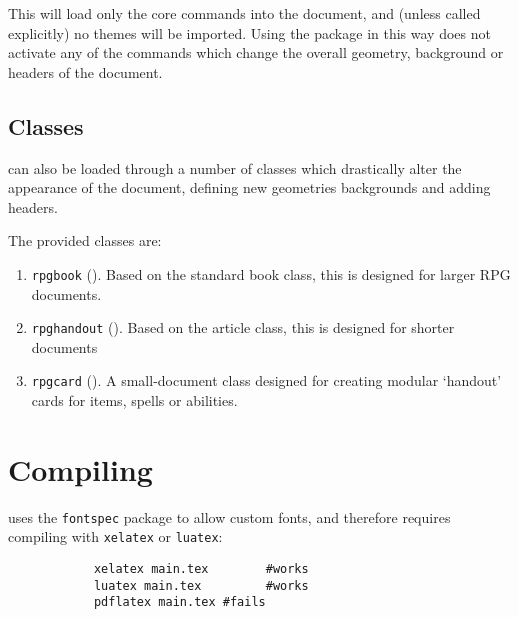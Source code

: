 			This will load only the core commands into the document, and (unless called explicitly) no themes will be imported. Using the package in this way does not activate any of the commands which change the overall geometry, background or headers of the document.

		\subsection{Classes}

			\rpgtex{} can also be loaded through a number of classes which drastically alter the appearance of the document, defining new geometries backgrounds and adding headers.

			The provided classes are:
			\begin{enumerate}
				\item \texttt{rpgbook} (). Based on the standard book class, this is designed for larger RPG documents.
				\item \texttt{rpghandout} (). Based on the article class, this is designed for shorter documents
				\item \texttt{rpgcard} (). A small-document class designed for creating modular `handout' cards for items, spells or abilities.
			\end{enumerate}
	\section{Compiling}

		\rpgtex{} uses the \texttt{fontspec} package to allow custom fonts, and therefore requires compiling with \texttt{xelatex} or \texttt{luatex}:

		\begin{lstlisting}
			xelatex main.tex		#works
			luatex main.tex			#works
			pdflatex main.tex #fails
		\end{lstlisting}

\onecolumn
